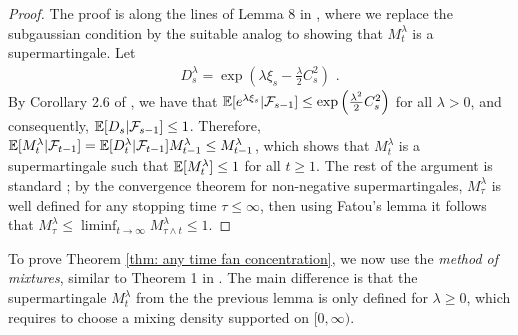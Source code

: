 \begin{proof} The proof is along the lines of Lemma 8 in \citep{Abbasi-YadkoriImprovedAlgorithmsLinear2011}, where we replace the subgaussian condition by the suitable analog to showing that $M_t^\lambda$ is a supermartingale. Let
	\begin{align*}
	D_s^\lambda = \exp\left(\lambda \xi_s - \frac{\lambda}{2} C_s^2\right) \text{ .}
	\end{align*}
	By Corollary 2.6 of \cite{FanExponentialinequalitiesmartingales2015}, we have that $\mathbb{E}[e^{\lambda\xi_s} |\mathcal{F}_{s-1}] \leq \exp\left(\tfrac{\lambda^2}{2}C_s^2\right)$ for all $\lambda > 0$, and consequently, $\mathbb{E}[D_s|\mathcal{F}_{s-1}] \leq 1$. Therefore, $\mathbb{E}[M_t^\lambda |\mathcal{F}_{t-1}] = \mathbb{E}[D_t^\lambda|\mathcal{F}_{t-1}] M_{t-1}^\lambda \leq M_{t-1}^\lambda$, which shows that $M_t^\lambda$ is a supermartingale such that $\mathbb{E}[M_t^\lambda] \leq 1$ for all $t \geq 1$. The rest of the argument is standard \cite[compare for example Theorem 5.7.6 in][]{DurrettProbabilitytheoryexamples2010}; by the convergence theorem for non-negative supermartingales, $M_\tau^\lambda$ is well defined for any stopping time $\tau \leq \infty$, then using Fatou's lemma it follows that $M_\tau^\lambda \leq \liminf_{t \rightarrow \infty} M_{\tau \wedge t}^\lambda \leq 1$. 
\end{proof}

To prove Theorem \ref{thm: any time fan concentration}, we now use the \emph{method of mixtures}, similar to Theorem 1 in \citep{Abbasi-YadkoriImprovedAlgorithmsLinear2011}. The main difference is that the supermartingale $M_t^\lambda$ from the the previous lemma is only defined for $\lambda \geq 0$, which requires to choose a mixing density supported on $[0, \infty)$.

